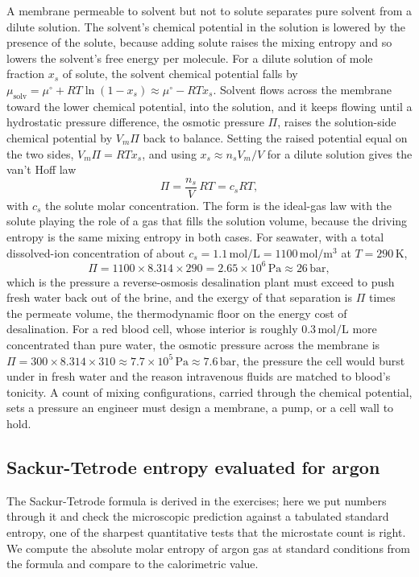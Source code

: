 A membrane permeable to solvent but not to solute separates pure solvent from a
dilute solution. The solvent's chemical potential in the solution is lowered by
the presence of the solute, because adding solute raises the mixing entropy and so
lowers the solvent's free energy per molecule. For a dilute solution of mole
fraction $x_s$ of solute, the solvent chemical potential falls by $\mu_{\text{solv}}
= \mu^\circ + RT\ln(1 - x_s) \approx \mu^\circ - RT x_s$. Solvent flows across the
membrane toward the lower chemical potential, into the solution, and it keeps
flowing until a hydrostatic pressure difference, the osmotic pressure $\Pi$, raises
the solution-side chemical potential by $V_m\Pi$ back to balance. Setting the
raised potential equal on the two sides, $V_m\Pi = RT x_s$, and using $x_s \approx
n_s V_m/V$ for a dilute solution gives the van't Hoff law
\[
\Pi = \frac{n_s}{V}\,RT = c_s R T,
\]
with $c_s$ the solute molar concentration. The form is the ideal-gas law with the
solute playing the role of a gas that fills the solution volume, because the
driving entropy is the same mixing entropy in both cases. For seawater, with a
total dissolved-ion concentration of about $c_s = 1.1\,\text{mol}/\text{L} =
1100\,\text{mol}/\text{m}^3$ at $T = 290\,\si{\kelvin}$,
\[
\Pi = 1100 \times 8.314 \times 290 = 2.65\times10^{6}\,\text{Pa} \approx 26\,
\text{bar},
\]
which is the pressure a reverse-osmosis desalination plant must exceed to push
fresh water back out of the brine, and the exergy of that separation is $\Pi$
times the permeate volume, the thermodynamic floor on the energy cost of
desalination. For a red blood cell, whose interior is roughly $0.3\,\text{mol}/
\text{L}$ more concentrated than pure water, the osmotic pressure across the
membrane is $\Pi = 300\times 8.314\times 310 \approx 7.7\times10^{5}\,\text{Pa}
\approx 7.6\,\text{bar}$, the pressure the cell would burst under in fresh water
and the reason intravenous fluids are matched to blood's tonicity. A count of
mixing configurations, carried through the chemical potential, sets a pressure an
engineer must design a membrane, a pump, or a cell wall to hold.

\subsection{Sackur-Tetrode entropy evaluated for argon}

The Sackur-Tetrode formula is derived in the exercises; here we put numbers
through it and check the microscopic prediction against a tabulated standard
entropy, one of the sharpest quantitative tests that the microstate count is
right. We compute the absolute molar entropy of argon gas at standard conditions
from the formula and compare to the calorimetric value.

